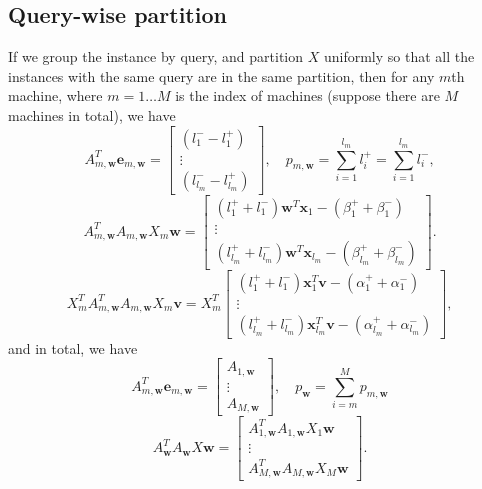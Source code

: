 \documentclass[11pt, oneside]{article}   	%
\def\bx{{\boldsymbol x}}
\def\bv{{\boldsymbol v}}
\def\bw{{\boldsymbol w}}
\def\bv{{\boldsymbol v}}
\def\be{{\boldsymbol e}}
\begin{document}
\subsection{Query-wise partition}
If we group the instance by query, and partition $X$ uniformly so that all the instances with the same query are in the same partition, then for any $m$th machine, where $m=1 \ldots M$ is the index of machines (suppose there are $M$ machines in total), we have
\begin{equation*}
	A_{m,\bw}^T\be_{m,\bw} = 
	\left[\begin{array}{c}
	(l_1^--l_1^+) \\
	\vdots \\
	(l_{l_m}^--l_{l_m}^+)
	\end{array}\right],
	\quad
	p_{m,\bw}
	=\sum_{i=1}^{l_m} l_i^+
	=\sum_{i=1}^{l_m} l_i^-,
\end{equation*}
\begin{equation*}
	A_{m,\bw}^TA_{m,\bw} X_{m}\bw =  
	\left[\begin{array}{c}
	(l_{1}^++l_{1}^-)\bw^T\bx_{1}-(\beta_{1}^++\beta_{1}^-) \\
	\vdots \\
	(l_{l_m}^++l_{l_m}^-)\bw^T\bx_{l_m}-(\beta_{l_m}^++\beta_{l_m}^-)
	\end{array}\right].
\end{equation*}
\begin{equation*}
	X_{m}^TA_{m,\bw}^TA_{m,\bw} X_m\bv = X_m^T 
	\left[\begin{array}{c}
	(l_{1}^++l_{1}^-)\bx_{1}^T\bv-(\alpha_{1}^++\alpha_{1}^-) \\
	\vdots \\
	(l_{l_m}^++l_{l_m}^-)\bx_{l_m}^T\bv-(\alpha_{l_m}^++\alpha_{l_m}^-)
	\end{array}\right],
\end{equation*}
and in total, we have
\begin{equation*}
	A_{m,\bw}^T\be_{m,\bw} = 
	\left[\begin{array}{c}
	A_{1,\bw} \\
	\vdots \\
	A_{M,\bw}
	\end{array}\right],
\quad
	p_{\bw}
	=\sum_{i=m}^{M} p_{m,\bw}
\end{equation*}
\begin{equation*}
	A_{\bw}^TA_{\bw} X\bw =  
	\left[\begin{array}{c}
	A_{1,\bw}^TA_{1,\bw} X_{1}\bw\\
	\vdots \\
	A_{M,\bw}^TA_{M,\bw} X_{M}\bw
	\end{array}\right].
\end{equation*}
\end{document}
